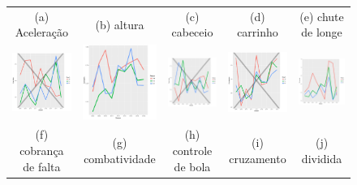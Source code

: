 \documentclass[doc,apacite,oneside,a4paper,12pt]{apa6}
\begin{document}
\begin{figure}
\begin{tabular}{ccccc}
\scriptsize{(a) Aceleração } & \scriptsize{(b) altura  } & \scriptsize{(c) cabeceio } & \scriptsize{(d) carrinho } & \scriptsize{(e) chute de longe }\\[3pt]
\includegraphics[width=25mm]{cobr_falta_result_trans} & \includegraphics[width=25mm]{combativ__result_trans} &   \includegraphics[width=25mm]{contr_bola_result_trans} &
  \includegraphics[width=25mm]{cruzamento_result_trans} & \includegraphics[width=25mm]{div_empe_result_trans} \\
 \scriptsize{(f) cobrança de falta } & \scriptsize{(g) combatividade } & \scriptsize{(h) controle de bola} & \scriptsize{(i) cruzamento} & \scriptsize{(j) dividida}\\[3pt]
 

\end{tabular}
\end{figure}
\end{document}
